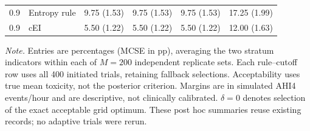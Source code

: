 \begin{table}[H]
\begin{tabular}{@{}clcccc@{}}
0.9 & Entropy rule & 9.75 (1.53) & 9.75 (1.53) & 9.75 (1.53) & 17.25 (1.99) \\
0.9 & cEI & 5.50 (1.22) & 5.50 (1.22) & 5.50 (1.22) & 12.00 (1.63) \\
\bottomrule
\end{tabular}
\vspace{3pt}
\begin{minipage}{0.98\linewidth}
\scriptsize\raggedright
\textit{Note.} Entries are percentages (MCSE in pp), averaging the two stratum indicators within each of $M=200$ independent replicate sets. Each rule--cutoff row uses all 400 initiated trials, retaining fallback selections. Acceptability uses true mean toxicity, not the posterior criterion. Margins are in simulated AHI4 events/hour and are descriptive, not clinically calibrated. $\delta=0$ denotes selection of the exact acceptable grid optimum. These post hoc summaries reuse existing records; no adaptive trials were rerun.
\end{minipage}
\end{table}
